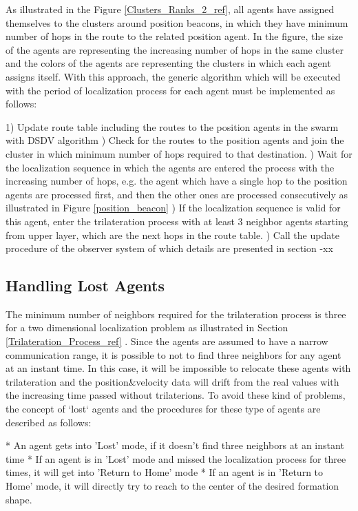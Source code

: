 As illustrated in the Figure \ref{Clusters_Ranks_2_ref}, all agents have assigned themselves to the clusters around position beacons, in which they have minimum number of hops in the route to the related position agent. In the figure, the size of the agents are representing the increasing number of hops in the same cluster and the colors of the agents are representing the clusters in which each agent assigns itself. With this approach, the generic algorithm which will be executed with the period of localization process for each agent must be implemented as follows:
	
	1) Update route table including the routes to the position agents in the swarm with DSDV algorithm ) Check for the routes to the position agents and join the cluster in which minimum number of hops required to that destination. ) Wait for the localization sequence in which the agents are entered the process with the increasing number of hops, e.g. the agent which have a single hop to the position agents are processed first, and then the other ones are processed consecutively as illustrated in Figure \ref{position_beacon} ) If the localization sequence is valid for this agent, enter the trilateration process with at least 3 neighbor agents starting from upper layer,  which are the next hops in the route table. ) Call the update procedure of the observer system of which details are presented in section -xx
	
\subsection{Handling Lost Agents} \label{LostAgents}
The minimum number of neighbors required for the trilateration process is three for a two dimensional localization problem as illustrated in Section \ref{Trilateration_Process_ref} . Since the agents are assumed to have a narrow communication range, it is possible to not to find three neighbors for any agent at an instant time. In this case, it will be impossible to relocate these agents with trilateration and the position$\&$velocity data will drift from the real values with the increasing time passed without trilaterions. To avoid these kind of problems, the concept of `lost` agents and the procedures for these type of agents are described as follows:
	
	* An agent gets into 'Lost' mode, if it doesn't find three neighbors at an instant time \newline
	* If an agent is in 'Lost' mode and missed the localization process for three times, it will get into 'Return to Home' mode \newline
	* If an agent is in 'Return to Home' mode, it will directly try to reach to the center of the desired formation shape.
		

